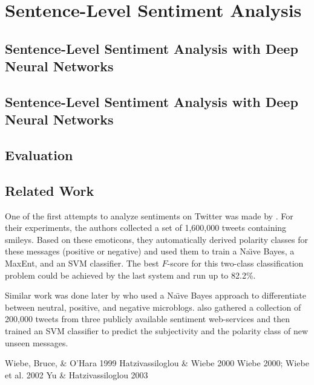 \section{Sentence-Level Sentiment Analysis}\label{sec:snt:slsa}

\subsection{Sentence-Level Sentiment Analysis with Deep Neural Networks}

\subsection{Sentence-Level Sentiment Analysis with Deep Neural Networks}

\subsection{Evaluation}

\subsection{Related Work}

One of the first attempts to analyze sentiments on Twitter was made by
\citet{Go:09}.  For their experiments, the authors collected a set of
1,600,000 tweets containing smileys.  Based on these emoticons, they
automatically derived polarity classes for these messages (positive or
negative) and used them to train a Na\"{\i}ve Bayes, a MaxEnt, and an
SVM classifier.  The best $F$-score for this two-class classification
problem could be achieved by the last system and run up to 82.2\%.

Similar work was done later by \citet{Pak:10} who used a Na\"{\i}ve
Bayes approach to differentiate between neutral, positive, and
negative microblogs. \citet{Barbosa:10} also gathered a collection of
200,000 tweets from three publicly available sentiment web-services
and then trained an SVM classifier to predict the subjectivity and the
polarity class of new unseen messages.

\citet{Kobayashi:07}
Wiebe, Bruce, \& O'Hara 1999
Hatzivassiloglou \& Wiebe 2000
Wiebe 2000; Wiebe et al. 2002
Yu \& Hatzivassiloglou 2003


\citet{Yessenalina:11}

